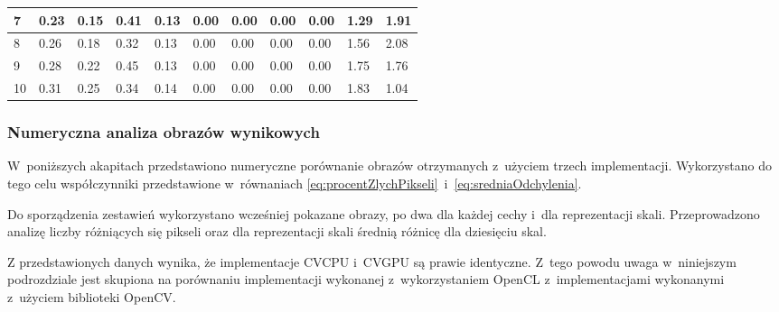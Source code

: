 {\begin{landscape}
\begin{table}[h]
\begin{tabular}{|p{0.8cm}|p{1.8cm}|p{1.8cm}|p{1.8cm}|p{1.8cm}|p{1.8cm}|p{1.8cm}|p{1.8cm}|p{1.8cm}|p{1.8cm}|p{1.8cm}|}
\multicolumn{1}{|l|}{7}        & 0.23                   & 0.15                   & 0.41                 & 0.13        & 0.00              & 0.00               & 0.00               & 0.00                & 1.29              & 1.91                    \\ \hline
\multicolumn{1}{|l|}{8}        & 0.26                   & 0.18                   & 0.32                 & 0.13        & 0.00              & 0.00               & 0.00               & 0.00                & 1.56              & 2.08                    \\ \hline
\multicolumn{1}{|l|}{9}        & 0.28                   & 0.22                   & 0.45                 & 0.13        & 0.00              & 0.00               & 0.00               & 0.00                & 1.75              & 1.76                    \\ \hline
\multicolumn{1}{|l|}{10}       & 0.31                   & 0.25                   & 0.34                 & 0.14        & 0.00              & 0.00               & 0.00               & 0.00                & 1.83              & 1.04                    \\ \hline
\end{tabular}
\end{table}
\end{landscape}}

\newpage

\subsubsection{Numeryczna analiza obrazów wynikowych}
\label{subsec:porownanieNumerycznePoprawnosc}

W~poniższych akapitach przedstawiono numeryczne porównanie obrazów otrzymanych z~użyciem trzech implementacji. Wykorzystano do tego celu współczynniki przedstawione w~równaniach \eqref{eq:procentZlychPikseli}~i~\eqref{eq:sredniaOdchylenia}.

Do sporządzenia zestawień wykorzystano wcześniej pokazane obrazy, po dwa dla każdej cechy i~dla reprezentacji skali. Przeprowadzono analizę liczby różniących się pikseli oraz dla reprezentacji skali średnią różnicę dla dziesięciu skal. 

Z przedstawionych danych wynika, że implementacje CVCPU i~CVGPU są prawie identyczne. Z~tego powodu uwaga w~niniejszym podrozdziale jest skupiona na porównaniu implementacji wykonanej z~wykorzystaniem OpenCL z~implementacjami wykonanymi z~użyciem biblioteki OpenCV.

